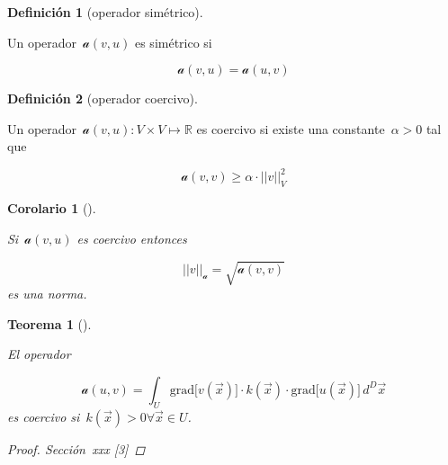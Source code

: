 \documentclass[
  12pt,
  a4paper,
  table]{scrbook}
\theoremstyle{plain}
\theoremstyle{definition}
\newtheorem{definition}{Definición}[chapter]
\theoremstyle{plain}
\newtheorem{theorem}{Teorema}[chapter]
\theoremstyle{plain}
\newtheorem{corollary}{Corolario}[chapter]
\theoremstyle{remark}
\begin{document}
\begin{definition}[operador
simétrico]\protect\hypertarget{def-a-simetrico}{}\label{def-a-simetrico}

Un operador~\(\mathcal{a}(v,u)\) es simétrico si

\[
\mathcal{a}(v,u) = \mathcal{a}(u,v)
\]

\end{definition}

\begin{definition}[operador
coercivo]\protect\hypertarget{def-a-simetrico}{}\label{def-a-simetrico}

Un operador~\(\mathcal{a}(v,u) : V \times V \mapsto \mathbb{R}\) es
coercivo si existe una constante~\(\alpha >0\) tal que

\[
\mathcal{a}(v,v) \geq \alpha \cdot || v ||^2_V
\]

\end{definition}

\begin{corollary}[]\protect\hypertarget{cor-norma}{}\label{cor-norma}

Si~\(\mathcal{a}(v,u)\) es coercivo entonces

\[
||v||_{\mathcal{a}} = \sqrt{\mathcal{a}(v,v)}
\] es una norma.

\end{corollary}

\begin{theorem}[]\protect\hypertarget{thm-poisson-coercivo}{}\label{thm-poisson-coercivo}

El operador

\[
\mathcal{a}(u,v) = \int_U \mathrm{grad}\Big[ v(\vec{x}) \Big] \cdot k(\vec{x}) \cdot \mathrm{grad}\Big[ u(\vec{x}) \Big] \, d^D \vec{x}
\] es coercivo si~\(k(\vec{x}) > 0 \forall \vec{x} \in U\).

\begin{proof}

Sección~xxx {[}3{]}

\end{proof}

\end{theorem}
\end{document}
